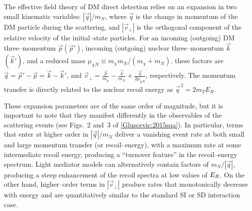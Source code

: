 \documentclass[11pt]{article}
\newcommand{\Eq}[1]{Eq.~(\ref{#1})} \newcommand{\Eqs}[2]{Eqs.~(\ref{#1}) and (\ref{#2})} \newcommand{\Eqm}[2]{Eqs.~(\ref{#1}) through (\ref{#2})}
\begin{document}


The effective field theory of DM direct detection \cite{Fitzpatrick:2012ix, Anand:2013yka} relies on an expansion in two small kinematic variables: $|\vec q|/m_N$, where $\vec q$ is the change in momentum of the DM particle during the scattering, and $|\vec v_\perp|$ is the orthogonal component of the relative velocity of the initial--state particles. For an incoming (outgoing) DM three--momentum $\vec p(\vec p')$, incoming (outgoing) nuclear three--momentum $\vec k$ $(\vec k')$, and a reduced mass $\mu_{\chi N} \equiv m_\chi m_N/(m_\chi +m_N)$, these factors are $\vec q=\vec p'-\vec p=\vec k-\vec k'$, and $\vec v_\perp=\frac{\vec p}{m_\chi}-\frac{\vec k}{m_N}+\frac{\vec q}{2\mu_{\chi N}}$, respectively.
The momentum transfer is directly related to the nuclear recoil energy as $\vec{q}^{\, 2} =2m_TE_R$. 

These expansion parameters are of the same order of magnitude, but it is important to note that they manifest differently in the observables of the scattering events (see \eg Figs.~2 and~3 of \ref{Gluscevic:2015sqa}). In particular, terms that enter at higher order in $|\vec q|/m_N$ deliver a vanishing event rate at both small and large momentum transfer (or recoil--energy), with a maximum rate at some intermediate recoil energy, producing a ``turnover feature'' in the recoil--energy spectrum. Light mediator models can alternatively contain factors of $m_N/|\vec q|$, producing a steep enhancement of the recoil spectra at low values of $E_R$. On the other hand, higher--order terms in $| \vec v_\perp|$ produce rates that monotonically decrease with energy and are quantitatively similar to the standard SI or SD interaction case. 
\end{document}
